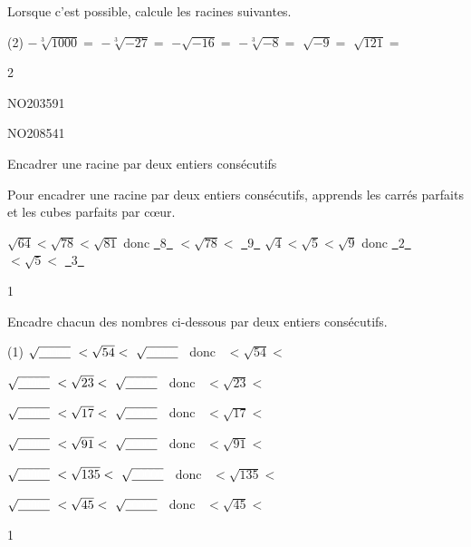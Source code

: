 \documentclass[a4paper,11pt]{report}
\begin{document}
\begin{exop}{
Lorsque c'est possible, calcule les racines suivantes.
\begin{tasks}(2)
    \task $-\sqrt[3]{1000}=$
    \task $-\sqrt[3]{-27}=$
    \task $-\sqrt{-16}=$
    \task $-\sqrt[3]{-8}=$
    \task $\sqrt{-9}=$
    \task $\sqrt{121}=$
\end{tasks}
}{2}    
\end{exop}





\begin{exof}{NO203}{59}{1} %
\end{exof}

\begin{exol}{NO208}{54}{1} %
\end{exol}




\begin{resolu}{Encadrer une racine par deux entiers consécutifs}{
Pour encadrer une racine par deux entiers consécutifs, apprends les carrés parfaits et les cubes parfaits par cœur.
\begin{tasks}
    \task $\sqrt{64} < \sqrt{78} < \sqrt{81}$ donc 
    \underline{~$8$~} $< \sqrt{78} <$ \underline{~$9$~}
    \task $\sqrt{4} < \sqrt{5} < \sqrt{9}$ donc 
    \underline{~$2$~} $< \sqrt{5} <$ \underline{~$3$~}
\end{tasks}
}{1}    
\end{resolu}

\begin{exop}{
    Encadre chacun des nombres ci-dessous par deux entiers consécutifs.
    \begin{tasks}(1)
    \task $\sqrt{\underline{{\color{white}00000}}} ~< \sqrt{54} <~\sqrt{\underline{{\color{white}00000}}}$ ~donc~ \hrulefill $< \sqrt{54}< $ \hrulefill

    \task $\sqrt{\underline{{\color{white}00000}}} ~< \sqrt{23} <~\sqrt{\underline{{\color{white}00000}}}$ ~donc~ \hrulefill $< \sqrt{23}< $ \hrulefill

    \task $\sqrt{\underline{{\color{white}00000}}} ~< \sqrt{17} <~\sqrt{\underline{{\color{white}00000}}}$ ~donc~ \hrulefill $< \sqrt{17}< $ \hrulefill

    \task $\sqrt{\underline{{\color{white}00000}}} ~< \sqrt{91} <~\sqrt{\underline{{\color{white}00000}}}$ ~donc~ \hrulefill $< \sqrt{91}< $ \hrulefill

    \task $\sqrt{\underline{{\color{white}00000}}} ~< \sqrt{135} <~\sqrt{\underline{{\color{white}00000}}}$ ~donc~ \hrulefill $< \sqrt{135}< $ \hrulefill

    \task $\sqrt{\underline{{\color{white}00000}}} ~< \sqrt{45} <~\sqrt{\underline{{\color{white}00000}}}$ ~donc~ \hrulefill $< \sqrt{45}< $ \hrulefill
    

    \end{tasks}
}{1}    
\end{exop}
\end{document}
